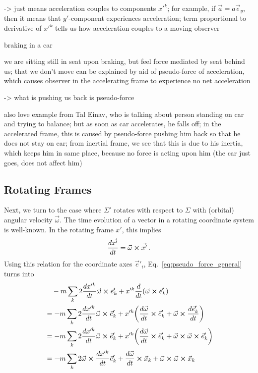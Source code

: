 \documentclass[../class_mech_main.tex]{subfiles}
\begin{document}
-> just means acceleration couples to components $x'^k$; for example, if $\vec{a} = a \vec{e}_y$, then it means that $y'$-component experiences acceleration; term proportional to derivative of $x'^k$ tells us how acceleration couples to a moving observer


\begin{ex}[Braking]
	braking in a car

	we are sitting still in seat upon braking, but feel force mediated by seat behind us; that we don't move can be explained by aid of pseudo-force of acceleration, which causes observer in the accelerating frame to experience no net acceleration

	-> what is pushing us back is pseudo-force


	also love example from Tal Einav, who is talking about person standing on car and trying to balance; but as soon as car accelerates, he falls off; in the accelerated frame, this is caused by pseudo-force pushing him back so that he does not stay on car; from inertial frame, we see that this is due to his inertia, which keeps him in same place, because no force is acting upon him (the car just goes, does not affect him)
\end{ex}




        \subsection{Rotating Frames}
Next, we turn to the case where $\Sigma'$ rotates with respect to $\Sigma$ with (orbital) angular velocity $\vec{\omega}$. The time evolution of a vector in a rotating coordinate system is well-known.  In the rotating frame $x'$, this implies
\begin{equation}
    \dv{\vec{x'}}{t} = \vec{\omega} \cross \vec{x'} \, .
\end{equation}
Using this relation for the coordinate axes $\vec{e}'_i$, Eq.~\eqref{eq:pseudo_force_general} turns into
\begin{align}
	&\quad - m \sum_k 2 \dv{x'^k}{t} \vec{\omega} \cross \vec{e}'_k + x'^k \dv{t} \qty(\vec{\omega} \cross \vec{e}'_k)
	\notag\\
	&= - m \sum_k 2 \dv{x'^k}{t} \vec{\omega} \cross \vec{e}'_k + x'^k \qty(\dv{\vec{\omega}}{t} \cross \vec{e}'_k + \vec{\omega} \cross \dv{\vec{e}'_k}{t})
	\notag\\
	&= - m \sum_k 2 \dv{x'^k}{t} \vec{\omega} \cross \vec{e}'_k + x'^k \qty(\dv{\vec{\omega}}{t} \cross \vec{e}'_k + \vec{\omega} \cross \vec{\omega} \cross \vec{e}'_k)
	\notag\\
	&= - m \sum_k 2 \vec{\omega} \cross \dv{x'^k}{t} \vec{e}'_k + \dv{\vec{\omega}}{t} \cross \vec{x}_k + \vec{\omega} \cross \vec{\omega} \cross \vec{x}_k
    \label{eq:pseudo_force_rot_frame}
\end{align}
\end{document}
